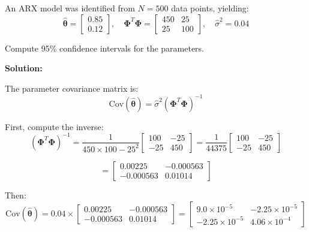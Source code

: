 \begin{example}
\label{ex:confidence}
An ARX model was identified from $N = 500$ data points, yielding:
\begin{equation*}
\hat{\boldsymbol{\theta}} = \begin{bmatrix} 0.85 \\ 0.12 \end{bmatrix}, \quad
\boldsymbol{\Phi}^T\boldsymbol{\Phi} = \begin{bmatrix} 450 & 25 \\ 25 & 100 \end{bmatrix}, \quad
\hat{\sigma}^2 = 0.04
\end{equation*}

Compute 95\% confidence intervals for the parameters.

\textbf{Solution:}

The parameter covariance matrix is:
\begin{equation*}
\text{Cov}(\hat{\boldsymbol{\theta}}) = \hat{\sigma}^2 (\boldsymbol{\Phi}^T\boldsymbol{\Phi})^{-1}
\end{equation*}

First, compute the inverse:
\begin{equation*}
(\boldsymbol{\Phi}^T\boldsymbol{\Phi})^{-1} = \frac{1}{450 \times 100 - 25^2} \begin{bmatrix} 100 & -25 \\ -25 & 450 \end{bmatrix}
= \frac{1}{44375} \begin{bmatrix} 100 & -25 \\ -25 & 450 \end{bmatrix}
\end{equation*}

\begin{equation*}
= \begin{bmatrix} 0.00225 & -0.000563 \\ -0.000563 & 0.01014 \end{bmatrix}
\end{equation*}

Then:
\begin{equation*}
\text{Cov}(\hat{\boldsymbol{\theta}}) = 0.04 \times \begin{bmatrix} 0.00225 & -0.000563 \\ -0.000563 & 0.01014 \end{bmatrix}
= \begin{bmatrix} 9.0 \times 10^{-5} & -2.25 \times 10^{-5} \\ -2.25 \times 10^{-5} & 4.06 \times 10^{-4} \end{bmatrix}
\end{equation*}


\end{example}
